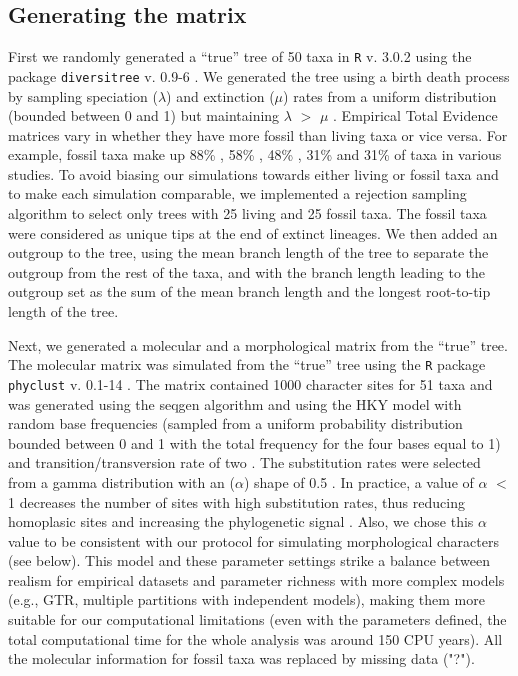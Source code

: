 \subsection{Generating the matrix}
\label{Generating_the_matrix}
First we randomly generated a ``true'' tree of 50 taxa in \texttt{R} v. 3.0.2 \citep{R} using the package \texttt{diversitree} v. 0.9-6 \citep{fitzjohndiversitree2012}.
We generated the tree using a birth death process by sampling speciation ($\lambda$) and extinction ($\mu$) rates from a uniform distribution (bounded between 0 and 1) but maintaining $\lambda$ $>$ $\mu$ \citep{paradistime-dependent2011}.
Empirical Total Evidence matrices vary in whether they have more fossil than living taxa or vice versa.
For example, fossil taxa make up 88\% \citep{beckancient2014}, 58\% \citep{schragocombining2013}, 48\% \citep{pyrondivergence2011}, 31\% \citep{ronquista2012} and 31\% \citep{Slater2012MEE} of taxa in various studies.
To avoid biasing our simulations towards either living or fossil taxa and to make each simulation comparable, we implemented a rejection sampling algorithm to select only trees with 25 living and 25 fossil taxa.
The fossil taxa were considered as unique tips at the end of extinct lineages.
We then added an outgroup to the tree, using the mean branch length of the tree to separate the outgroup from the rest of the taxa, and with the branch length leading to the outgroup set as the sum of the mean branch length and the longest root-to-tip length of the tree.

Next, we generated a molecular and a morphological matrix from the ``true'' tree.
The molecular matrix was simulated from the ``true'' tree using the \texttt{R} package \texttt{phyclust} v. 0.1-14 \citep{chen2011}.
The matrix contained 1000 character sites for 51 taxa and was generated using the seqgen algorithm \citep{ranbaut1997seqgen} and using the HKY model \citep{HKY85} with random base frequencies (sampled from a uniform probability distribution bounded between 0 and 1 with the total frequency for the four bases equal to 1) and transition/transversion rate of two \citep{douadycomparison2003}.
The substitution rates were selected from a gamma distribution with an ($\alpha$) shape of 0.5 \citep{yangamong-site1996}.
In practice, a value of $\alpha$ $<$ 1 decreases the number of sites with high substitution rates, thus reducing homoplasic sites and increasing the phylogenetic signal \citep{Hassanin1998611,EstoupHomoplasy}.
Also, we chose this $\alpha$ value to be consistent with our protocol for simulating morphological characters (see below).
This model and these parameter settings strike a balance between realism for empirical datasets \citep[e.g.][]{douadycomparison2003,kellymolecular2014} and parameter richness with more complex models (e.g., GTR, multiple partitions with independent models), making them more suitable for our computational limitations (even with the parameters defined, the total computational time for the whole analysis was around 150 CPU years).
All the molecular information for fossil taxa was replaced by missing data ("?").

